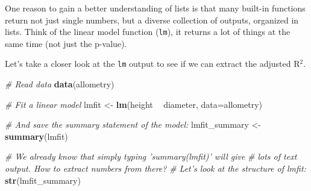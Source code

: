 \documentclass[]{book}
\newenvironment{Shaded}{\begin{snugshade}}{\end{snugshade}}
\newcommand{\CommentTok}[1]{\textcolor[rgb]{0.56,0.35,0.01}{\textit{#1}}}
\newcommand{\DataTypeTok}[1]{\textcolor[rgb]{0.13,0.29,0.53}{#1}}
\newcommand{\KeywordTok}[1]{\textcolor[rgb]{0.13,0.29,0.53}{\textbf{#1}}}
\newcommand{\NormalTok}[1]{#1}
\newcommand{\OperatorTok}[1]{\textcolor[rgb]{0.81,0.36,0.00}{\textbf{#1}}}
\newcommand{\StringTok}[1]{\textcolor[rgb]{0.31,0.60,0.02}{#1}}
\begin{document}
One reason to gain a better understanding of lists is that many built-in functions return not just single numbers, but a diverse collection of outputs, organized in lists. Think of the linear model function (\texttt{lm}), it returns a lot of things at the same time (not just the p-value).

Let's take a closer look at the \texttt{lm} output to see if we can extract the adjusted R\(^2\).

\begin{Shaded}
\begin{Highlighting}[]
\CommentTok{# Read data}
\KeywordTok{data}\NormalTok{(allometry)}

\CommentTok{# Fit a linear model}
\NormalTok{lmfit <-}\StringTok{ }\KeywordTok{lm}\NormalTok{(height }\OperatorTok{~}\StringTok{ }\NormalTok{diameter, }\DataTypeTok{data=}\NormalTok{allometry)}

\CommentTok{# And save the summary statement of the model:}
\NormalTok{lmfit_summary <-}\StringTok{ }\KeywordTok{summary}\NormalTok{(lmfit)}

\CommentTok{# We already know that simply typing 'summary(lmfit)' will give }
\CommentTok{# lots of text output. How to extract numbers from there?}
\CommentTok{# Let's look at the structure of lmfit:}
\KeywordTok{str}\NormalTok{(lmfit_summary)}
\end{Highlighting}
\end{Shaded}
\end{document}
